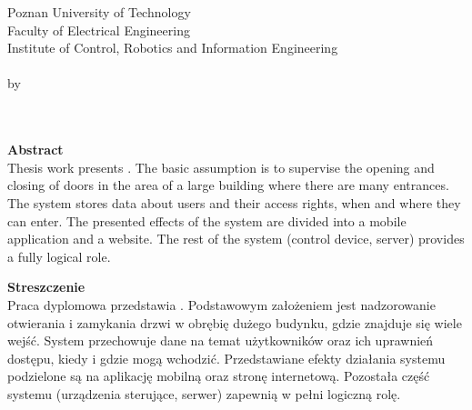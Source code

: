 \newpage
\thispagestyle{empty}
\begin{center}
Poznan University of Technology\\
Faculty of Electrical Engineering\\
Institute of Control, Robotics and Information Engineering\\
  \vspace{15mm}
\huge{\TytulAngielski} \\
\large{by}\\
  \vspace{5mm}
\large{\StudentA}\\
\large{\StudentB}\\
  \vspace{15mm}

\normalsize\textbf{Abstract} \\
{Thesis work presents \TytulAngielski. The basic assumption is to supervise the opening and closing of doors in the area of a large building where there are many entrances. The system stores data about users and their access rights, when and where they can enter. The presented effects of the system are divided into a mobile application and a website. The rest of the system (control device, server) provides a fully logical role.} 

\end{center}

\begin{center}
 \textbf{Streszczenie} \\
 {Praca dyplomowa przedstawia \TytulPolski. Podstawowym założeniem jest nadzorowanie otwierania i zamykania drzwi w obrębię dużego budynku, gdzie znajduje się wiele wejść. System przechowuje dane na temat użytkowników oraz ich uprawnień dostępu, kiedy i gdzie mogą wchodzić. Przedstawiane efekty działania systemu podzielone są na aplikację mobilną oraz stronę internetową. Pozostała część systemu (urządzenia sterujące, serwer) zapewnią w pełni logiczną rolę.} 
\end{center}

 
